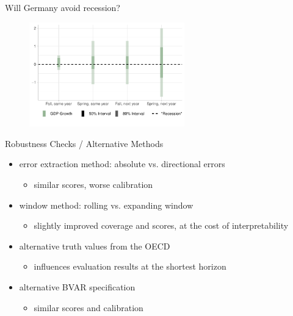 \documentclass[en]{sdqbeamer}
\begin{document}
\addtocounter{framenumber}{-1}
\begin{frame}{Will Germany avoid recession?}
\begin{figure}
        \centering
        \includegraphics[width=0.6\textwidth]{figures/horizon_uncc_germany2023_current.pdf}
        \label{fig:enter-label}
    \end{figure}


\end{frame}


\begin{frame}{Robustness Checks / Alternative Methods}
\begin{itemize}
    \item error extraction method: absolute vs. directional errors
    \begin{itemize}
    \item similar scores, worse calibration \hyperlink{errorextraction}{}
    \end{itemize}
    \item window method: rolling vs. expanding window
    \begin{itemize}
    \item slightly improved coverage and scores, at the cost of interpretability 
    \end{itemize}

    \item alternative truth values from the OECD
    \begin{itemize}
    \item influences evaluation results at the shortest horizon \hyperlink{alternativetruth}{}
    \end{itemize}
    \item alternative BVAR specification
    \begin{itemize}
    \item similar scores and calibration \hyperlink{alternativebvar}{}
    \end{itemize}
\end{itemize}
\end{frame}
\end{document}
